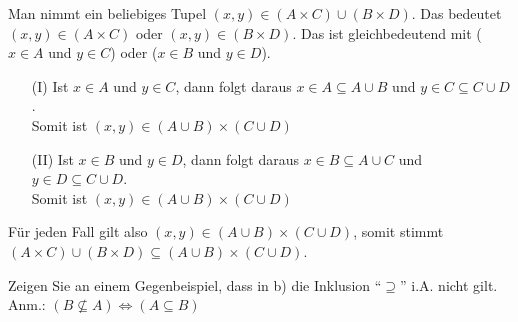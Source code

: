 Man nimmt ein beliebiges Tupel $(x,y) \in (A \times C) \cup (B \times D)$. Das bedeutet $(x,y) \in (A \times C)$ oder $(x,y) \in (B \times D)$. Das ist gleichbedeutend mit ($x \in A$ und $y \in C$) oder ($x \in B$ und $y \in D$).

\begin{enumerate}[leftmargin=2em]
\item[(I)] Ist $x \in A$ und $y \in C$, dann folgt daraus $x \in A \subseteq A \cup B$ und $y \in C \subseteq C \cup D$.\\
Somit ist $(x,y) \in (A \cup B) \times (C \cup D)$
\item[(II)] Ist $x \in B$ und $y \in D$, dann folgt daraus $x \in B \subseteq A \cup C$ und $y \in D \subseteq C \cup D$.\\
Somit ist $(x,y) \in (A \cup B) \times (C \cup D)$
\end{enumerate}

Für jeden Fall gilt also $(x,y) \in (A \cup B) \times (C \cup D)$, somit stimmt $(A \times C) \cup (B \times D) \subseteq (A \cup B) \times (C \cup D)$.

\newpage

Zeigen Sie an einem Gegenbeispiel, dass in b) die Inklusion ``$\supseteq$'' i.A. nicht gilt.\\
Anm.: $(B \nsubseteq A) \Leftrightarrow (A \subseteq B)$

\newpage